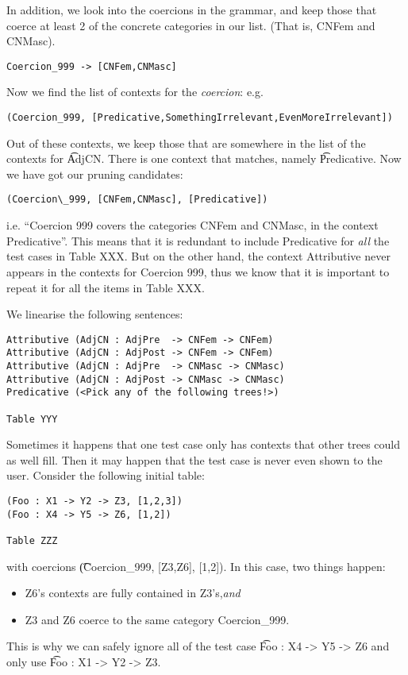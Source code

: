 In addition, we look into the coercions in the grammar, and keep those
that coerce at least 2 of the concrete categories in our list. (That
is, CNFem and CNMasc).

\begin{verbatim}
Coercion_999 -> [CNFem,CNMasc]
\end{verbatim}

Now we find the list of contexts for the \emph{coercion}: e.g.

\begin{verbatim}
(Coercion_999, [Predicative,SomethingIrrelevant,EvenMoreIrrelevant])
\end{verbatim}

Out of these contexts, we keep those that are somewhere in the list of
the contexts for \t{AdjCN}. There is one context that matches, namely
\t{Predicative}. Now we have got our pruning candidates:

\begin{verbatim}
(Coercion\_999, [CNFem,CNMasc], [Predicative])
\end{verbatim}

i.e. ``Coercion 999 covers the categories CNFem and CNMasc, in the
context Predicative''. This means that it is redundant to include
Predicative for \emph{all} the test cases in Table XXX. But on the
other hand, the context Attributive never appears in the contexts for
Coercion 999, thus we know that it is important to repeat it for all
the items in Table XXX.

We linearise the following sentences:

\begin{verbatim}
Attributive (AdjCN : AdjPre  -> CNFem -> CNFem)
Attributive (AdjCN : AdjPost -> CNFem -> CNFem)
Attributive (AdjCN : AdjPre  -> CNMasc -> CNMasc)
Attributive (AdjCN : AdjPost -> CNMasc -> CNMasc)
Predicative (<Pick any of the following trees!>)

Table YYY
\end{verbatim}

Sometimes it happens that one test case only has contexts that other
trees could as well fill. Then it may happen that the test case is
never even shown to the user. Consider the following initial table:

\begin{verbatim}
(Foo : X1 -> Y2 -> Z3, [1,2,3])
(Foo : X4 -> Y5 -> Z6, [1,2])

Table ZZZ
\end{verbatim}

with coercions \t{(Coercion\_999, [Z3,Z6], [1,2])}. In this case, two
things happen:
\begin{itemize}
\item Z6's contexts are fully contained in Z3's,\emph{and} 
\item Z3 and Z6 coerce to the same category Coercion\_999.
\end{itemize}
This is why we can safely ignore all of the test case \t{Foo : X4 ->
  Y5 -> Z6} and only use \t{Foo : X1 -> Y2 -> Z3}.

